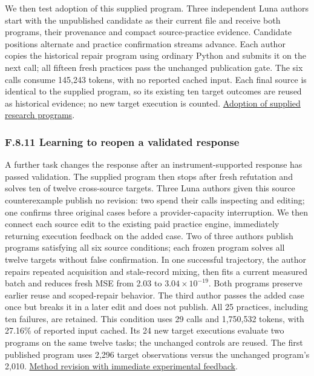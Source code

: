 \documentclass[twoside,11pt]{article}
\begin{document}
We then test adoption of this supplied program. Three independent Luna authors
start with the unpublished candidate as their current file and receive both
programs, their provenance and compact source-practice evidence. Candidate
positions alternate and practice confirmation streams advance. Each author
copies the historical repair program using ordinary Python and submits it on
the next call; all fifteen fresh practices pass the unchanged publication gate.
The six calls consume 145,243 tokens, with no reported cached input. Each final
source is identical to the supplied program, so its existing ten target outcomes
are reused as historical evidence; no new target execution is counted.
\hyperlink{artifact-92}{Adoption of supplied research programs}.


\subsubsection*{F.8.11 Learning to reopen a validated response}

A further task changes the response after an instrument-supported response has
passed validation. The supplied program then stops after fresh refutation and
solves ten of twelve cross-source targets. Three Luna authors given this source
counterexample publish no revision: two spend their calls inspecting and editing;
one confirms three original cases before a provider-capacity interruption. We
then connect each source edit to the existing paid practice engine, immediately
returning execution feedback on the added case. Two of three authors publish
programs satisfying all six source conditions; each frozen program solves all
twelve targets without false confirmation. In one successful trajectory, the
author repairs repeated acquisition and stale-record mixing, then fits a current
measured batch and reduces fresh MSE from 2.03 to \(3.04\times10^{-19}\). Both
programs preserve earlier reuse and scoped-repair behavior. The third author
passes the added case once but breaks it in a later edit and does not publish.
All 25 practices, including ten failures, are retained. This condition uses
29 calls and 1,750,532 tokens, with 27.16\% of reported input cached. Its 24 new
target executions evaluate two programs on the same twelve tasks; the unchanged
controls are reused. The first published program uses 2,296 target observations
versus the unchanged program's 2,010.
\hyperlink{artifact-93}{Method revision with immediate experimental feedback}.
\end{document}
